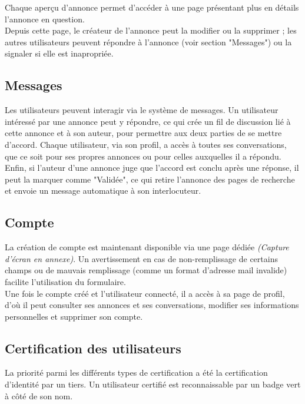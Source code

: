 \documentclass[a4paper,11pt]{article}
\begin{document}
Chaque aperçu d'annonce permet d'accéder à une page présentant plus en détails l'annonce en question.\\
Depuis cette page, le créateur de l'annonce peut la modifier ou la supprimer ; les autres utilisateurs peuvent répondre à l'annonce (voir section "Messages") ou la signaler si elle est inapropriée.\\

\subsection{Messages}

Les utilisateurs peuvent interagir via le système de messages. Un utilisateur intéressé par une annonce peut y répondre, ce qui crée un fil de discussion lié à cette annonce et à son auteur, pour permettre aux deux parties de se mettre d'accord. Chaque utilisateur, via son profil, a accès à toutes ses conversations, que ce soit pour ses propres annonces ou pour celles auxquelles il a répondu. Enfin, si l'auteur d'une annonce juge que l'accord est conclu après une réponse, il peut la marquer comme "Validée", ce qui retire l'annonce des pages de recherche et envoie un message automatique à son interlocuteur.


\subsection{Compte}

La création de compte est maintenant disponible via une page dédiée \textit{(Capture d'écran en annexe)}. Un avertissement en cas de non-remplissage de certains champs ou de mauvais remplissage (comme un format d'adresse mail invalide) facilite l'utilisation du formulaire.\\
Une fois le compte créé et l'utilisateur connecté, il a accès à sa page de profil, d'où il peut consulter ses annonces et ses conversations, modifier ses informations personnelles et supprimer son compte.



\subsection{Certification des utilisateurs}

La priorité parmi les différents types de certification a été la certification d'identité par un tiers. Un utilisateur certifié est reconnaissable par un badge vert à côté de son nom.\\
\end{document}
